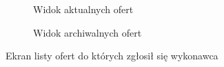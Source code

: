 \begin{figure}[ht!]
\begin{subfigure}[t]{0.32\textwidth}
    \caption{Widok aktualnych ofert}
  \end{subfigure}
  \begin{subfigure}[t]{0.32\textwidth}
    \centering
    \caption{Widok archiwalnych ofert}
  \end{subfigure}
  \caption{Ekran listy ofert do których zgłosił się wykonawca}
  \label{fig:offers-expert}
\end{figure}

